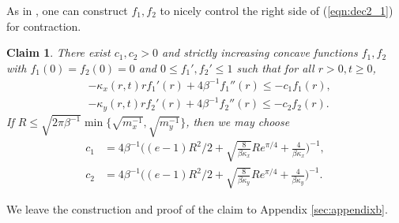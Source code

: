 \documentclass[11pt]{article}
\newtheorem{claim}[theorem]{Claim}
\newcommand{\1}{\mathds{1}}
\begin{document}
As in \cite{eberle2016reflection}, one can construct $f_1, f_2$ to nicely control the right side of (\ref{eqn:dec2_1}) for contraction. 
\begin{claim}\label{claim:nov5}
    There exist $c_1, c_2>0$ and strictly increasing concave functions $f_1, f_2$ with $f_1(0)=f_2(0)=0$ and $0\leq f_1', f_2'\leq 1$ such that for all $r>0, t\geq 0$,
    \begin{equation}\label{eqn:dec2_2}
        \begin{aligned}
            & - \kappa_x(r,t) r f_1'(r)+4\beta^{-1} f_1''(r)\leq -c_1 f_1(r),\\
            & - \kappa_y(r,t) r f_2'(r)+4\beta^{-1} f_2''(r)\leq -c_2f_2(r). 
        \end{aligned}
    \end{equation}
    If $R\leq \sqrt{2\pi\beta^{-1}}\min\big\{\sqrt{m_x^{-1}},\sqrt{m_y^{-1}}\big\}$, then we may choose 
    \begin{equation}
        \begin{aligned}
            c_1 &= 4\beta^{-1} \Big((e-1)R^2/2 + \sqrt{\frac{8}{\beta \kappa_x}}Re^{\pi/4}+ \frac{4}{\beta \kappa_x}\Big)^{-1},\\
            c_2 &= 4\beta^{-1} \Big((e-1)R^2/2 + \sqrt{\frac{8}{\beta \kappa_y}}Re^{\pi/4}+ \frac{4}{\beta \kappa_y}\Big)^{-1}.
        \end{aligned}
    \end{equation}
\end{claim}
We leave the construction and proof of the claim to Appendix \ref{sec:appendixb}.
\end{document}
